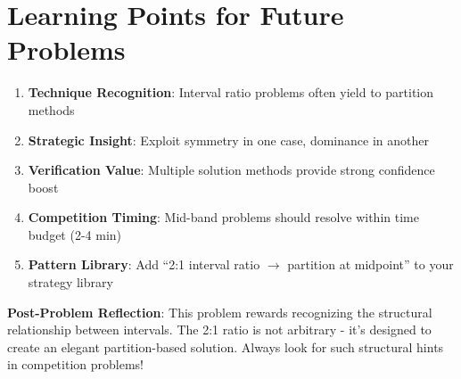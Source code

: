 \documentclass[]{article}
\begin{document}
\section*{Learning Points for Future Problems}
\begin{enumerate}
    \item \textbf{Technique Recognition}: Interval ratio problems often yield to partition methods
    \item \textbf{Strategic Insight}: Exploit symmetry in one case, dominance in another
    \item \textbf{Verification Value}: Multiple solution methods provide strong confidence boost
    \item \textbf{Competition Timing}: Mid-band problems should resolve within time budget (2-4 min)
    \item \textbf{Pattern Library}: Add ``2:1 interval ratio $\rightarrow$ partition at midpoint'' to your strategy library
\end{enumerate}

\textbf{Post-Problem Reflection}: This problem rewards recognizing the structural relationship between intervals. The 2:1 ratio is not arbitrary - it's designed to create an elegant partition-based solution. Always look for such structural hints in competition problems!
\end{document}
